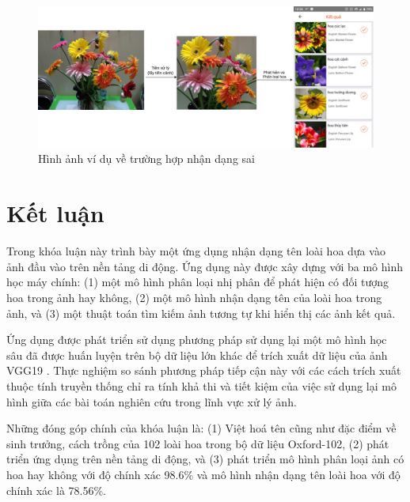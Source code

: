 \documentclass[12pt]{report}
\begin{document}
		\begin{figure}[h]
			\centering
			\includegraphics[scale=0.18]{vidunhandangsai}
			\caption{Hình ảnh ví dụ về trường hợp nhận dạng sai}
			\label{fig:app_comment}
		\end{figure}

																																																												
		\chapter{Kết luận}
		\label{chap:conclusion}
																																																												
		Trong khóa luận này trình bày một ứng dụng nhận dạng tên loài hoa dựa vào ảnh đầu vào trên nền tảng di động. Ứng dụng này được xây dựng với ba mô hình học máy chính: (1) một mô hình phân loại nhị phân để phát hiện có đối tượng hoa trong ảnh hay không, (2) một mô hình nhận dạng tên của loài hoa trong ảnh, và (3) một thuật toán tìm kiếm ảnh tương tự khi hiển thị các ảnh kết quả. 
																																																												
		Ứng dụng được phát triển sử dụng phương pháp sử dụng lại một mô hình học sâu đã được huấn luyện trên bộ dữ liệu lớn khác để trích xuất dữ liệu của ảnh VGG19 \cite{cia_vgg19}. Thực nghiệm so sánh phương pháp tiếp cận này với các cách trích xuất thuộc tính truyền thống chỉ ra tính khả thi và tiết kiệm của việc sử dụng lại mô hình giữa các bài toán nghiên cứu trong lĩnh vực xử lý ảnh.
																																																												
		Những đóng góp chính của khóa luận là: (1) Việt hoá tên cũng như đặc điểm về sinh trưởng, cách trồng của 102 loài hoa trong bộ dữ liệu Oxford-102, (2) phát triển ứng dụng trên nền tảng di động, và (3) phát triển mô hình phân loại ảnh có hoa hay không với độ chính xác 98.6\% và mô hình nhận dạng tên loài hoa với độ chính xác là 78.56\%.
																																																												
\end{document}
